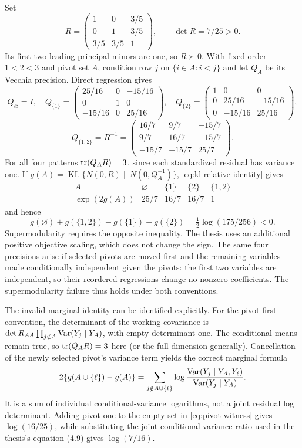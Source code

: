 Set
\begin{equation}
 R=\begin{pmatrix}1&0&3/5\\0&1&3/5\\3/5&3/5&1\end{pmatrix},
 \qquad \det R=7/25>0.
 \label{eq:pivot-witness}
\end{equation}
Its first two leading principal minors are one, so $R\succ0$.
With fixed order $1<2<3$ and pivot set $A$, condition row $j$ on
$\{i\in A:i<j\}$ and let $Q_A$ be its Vecchia precision. Direct
regression gives
\[
 Q_\varnothing=I,\quad
 Q_{\{1\}}=\begin{pmatrix}25/16&0&-15/16\\0&1&0\\-15/16&0&25/16\end{pmatrix},
 \quad
 Q_{\{2\}}=\begin{pmatrix}1&0&0\\0&25/16&-15/16\\0&-15/16&25/16\end{pmatrix},
\]
\[
 Q_{\{1,2\}}=R^{-1}
 =\begin{pmatrix}16/7&9/7&-15/7\\9/7&16/7&-15/7\\-15/7&-15/7&25/7\end{pmatrix}.
\]
For all four patterns $\operatorname{tr}(Q_AR)=3$, since each standardized residual has
variance one. If $g(A)=\operatorname{KL}\{N(0,R)\|N(0,Q_A^{-1})\}$,
\eqref{eq:kl-relative-identity} gives
\[
 \begin{array}{c|rrrr}
 A&\varnothing&\{1\}&\{2\}&\{1,2\}\\\hline
 \exp(2g(A))&25/7&16/7&16/7&1
 \end{array}
\]
and hence
\begin{equation}
 g(\varnothing)+g(\{1,2\})-g(\{1\})-g(\{2\})
          =\tfrac12\log(175/256)<0.
 \label{eq:pivot-supermodularity-slack}
\end{equation}
Supermodularity requires the opposite inequality. The thesis uses an
additional positive objective scaling, which does not change the sign.
The same four precisions arise if selected pivots are moved first and the
remaining variables made conditionally independent given the pivots: the
first two variables are independent, so their reordered regressions change
no nonzero coefficients. The supermodularity failure thus holds under
both conventions.

The invalid marginal identity can be identified explicitly. For the
pivot-first convention, the determinant of the working covariance is
$\det R_{AA}\prod_{j\notin A}\operatorname{Var}(Y_j\mid Y_A)$, with empty determinant
one. The conditional means remain true, so $\operatorname{tr}(Q_AR)=3$ here (or the
full dimension generally). Cancellation of the newly selected pivot's
variance term yields the correct marginal formula
\[
 2\{g(A\cup\{\ell\})-g(A)\}
 =\sum_{j\notin A\cup\{\ell\}}
 \log\frac{\operatorname{Var}(Y_j\mid Y_A,Y_\ell)}{\operatorname{Var}(Y_j\mid Y_A)}.
\]
It is a sum of individual conditional-variance logarithms, not a joint
residual log determinant. Adding pivot one to the empty set in
\eqref{eq:pivot-witness} gives $\log(16/25)$, while substituting the
joint conditional-variance ratio used in the thesis's equation (4.9)
gives $\log(7/16)$.

